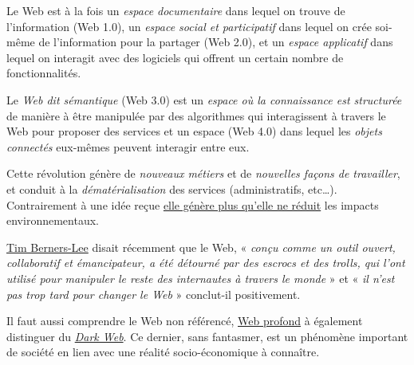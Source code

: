 \begin{jazzitemize}
\item Le Web est à la fois un \emph{espace documentaire} dans lequel on trouve de l'information (Web 1.0), un \emph{espace social et participatif} dans lequel on crée soi-même de l'information pour la partager (Web 2.0),  et un \emph{espace applicatif} dans lequel on interagit avec des logiciels qui offrent un certain nombre de fonctionnalités.
\item Le \emph{Web dit sémantique} (Web 3.0) est un \emph{espace où la connaissance est structurée} de manière à être manipulée par des algorithmes qui interagissent à travers le Web pour proposer des services et un espace (Web 4.0) dans lequel les \emph{objets connectés} eux-mêmes peuvent interagir entre eux.
\item Cette révolution génère de \emph{nouveaux métiers} et de \emph{nouvelles façons de travailler}, et conduit à la \emph{dématérialisation} des services (administratifs, etc…). Contrairement à une idée reçue \href{https://fr.wikipedia.org/wiki/D\%C3\%A9mat\%C3\%A9rialisation\#Aspects_environnementaux}{elle génère plus qu'elle ne réduit} les impacts environnementaux.
\item \href{https://fr.wikipedia.org/wiki/Tim_Berners-Lee}{Tim Berners-Lee} disait récemment que le Web, « \textit{conçu comme un outil ouvert, collaboratif et émancipateur, a été détourné par des escrocs et des \textup{trolls}, qui l’ont utilisé pour manipuler le reste des internautes à travers le monde} » et « \textit{il n'est pas trop tard pour changer le Web} » conclut-il positivement.
\item Il faut aussi comprendre le Web non référencé, \href{https://fr.wikipedia.org/wiki/Web_profond}{Web profond} à également distinguer du \href{https://fr.wikipedia.org/wiki/Dark_web}{\textit{Dark Web}}. Ce dernier, sans fantasmer, est un phénomène important de société en lien avec une réalité socio-économi\-que à connaître.
\end{jazzitemize}

